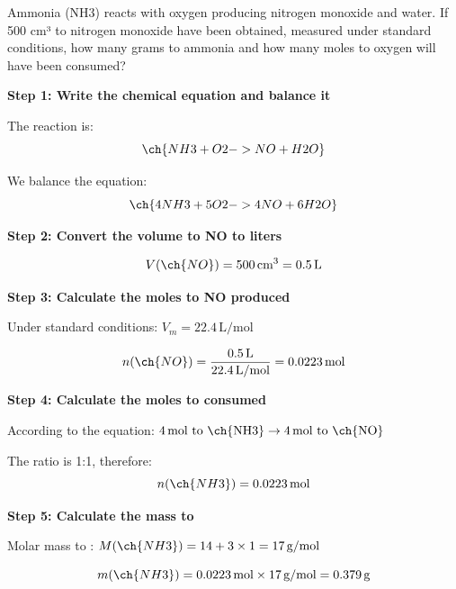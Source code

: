\begin{exercise}
    Ammonia (NH3) reacts with oxygen producing nitrogen monoxide and water. If
    500 cm³ to nitrogen monoxide have been obtained, measured under standard conditions,
    how many grams to ammonia and how many moles to oxygen will have been consumed?
    \begin{solu}
        \textbf{Step 1: Write the chemical equation and balance it}

        The reaction is:
        \begin{equation*}
            \ch{NH3 + O2 -> NO + H2O}
        \end{equation*}

        We balance the equation:
        \begin{equation*}
            \ch{4 NH3 + 5 O2 -> 4 NO + 6 H2O}
        \end{equation*}

        \textbf{Step 2: Convert the volume to NO to liters}

        \begin{equation*}
            V(\ch{NO}) = 500\,\text{cm}^3 = 0.5\,\text{L}
        \end{equation*}

        \textbf{Step 3: Calculate the moles to NO produced}

        Under standard conditions: $V_m = 22.4\,\text{L/mol}$

        \begin{equation*}
            n(\ch{NO}) = \frac{0.5\,\text{L}}{22.4\,\text{L/mol}} = 0.0223\,\text{mol}
        \end{equation*}

        \textbf{Step 4: Calculate the moles to  consumed}

        According to the equation: $4\,\text{mol to \ch{NH3}} \rightarrow 4\,\text{mol to \ch{NO}}$

        The ratio is 1:1, therefore:
        \begin{equation*}
            n(\ch{NH3}) = 0.0223\,\text{mol}
        \end{equation*}

        \textbf{Step 5: Calculate the mass to }

        Molar mass to : $M(\ch{NH3}) = 14 + 3 \times 1 = 17\,\text{g/mol}$

        \begin{equation*}
            m(\ch{NH3}) = 0.0223\,\text{mol} \times 17\,\text{g/mol} = 0.379\,\text{g}
        \end{equation*}


\end{solu}
\end{exercise}
